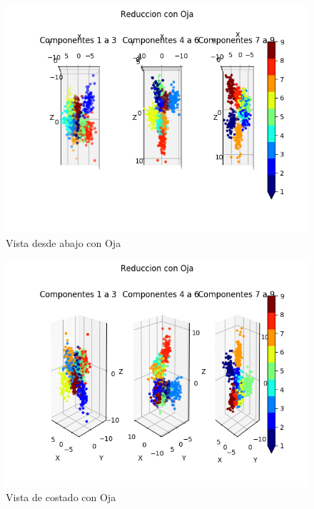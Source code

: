 \begin{figure}[H]
  \includegraphics[width=160mm]{imagenes/componentes_oja_2.png}
  \caption{Vista desde abajo con Oja}
\end{figure}

\begin{figure}[H]
  \includegraphics[width=160mm]{imagenes/componentes_oja_3.png}
  \caption{Vista de costado con Oja}
\end{figure}

